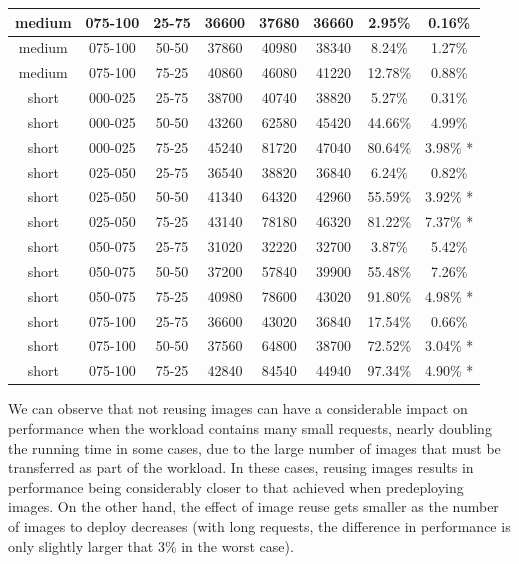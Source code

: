 \begin{table}
\begin{center}
\begin{tabular}{|c|c|c|c|c|c|c|c|}
\\\hline
medium & 075-100 & 25-75 & 36600 & 37680 & 36660 & 2.95\% & 0.16\%
\\\hline
medium & 075-100 & 50-50 & 37860 & 40980 & 38340 & 8.24\% & 1.27\%
\\\hline
medium & 075-100 & 75-25 & 40860 & 46080 & 41220 & 12.78\% & 0.88\%
\\\hline
short & 000-025 & 25-75 & 38700 & 40740 & 38820 & 5.27\% & 0.31\%
\\\hline
short & 000-025 & 50-50 & 43260 & 62580 & 45420 & 44.66\% & 4.99\%
\\\hline
short & 000-025 & 75-25 & 45240 & 81720 & 47040 & 80.64\% & 3.98\% *
\\\hline
short & 025-050 & 25-75 & 36540 & 38820 & 36840 & 6.24\% & 0.82\%
\\\hline
short & 025-050 & 50-50 & 41340 & 64320 & 42960 & 55.59\% & 3.92\% *
\\\hline
short & 025-050 & 75-25 & 43140 & 78180 & 46320 & 81.22\% & 7.37\% *
\\\hline
short & 050-075 & 25-75 & 31020 & 32220 & 32700 & 3.87\% & 5.42\%
\\\hline
short & 050-075 & 50-50 & 37200 & 57840 & 39900 & 55.48\% & 7.26\%
\\\hline
short & 050-075 & 75-25 & 40980 & 78600 & 43020 & 91.80\% & 4.98\% *
\\\hline
short & 075-100 & 25-75 & 36600 & 43020 & 36840 & 17.54\% & 0.66\%
\\\hline
short & 075-100 & 50-50 & 37560 & 64800 & 38700 & 72.52\% & 3.04\% *
\\\hline
short & 075-100 & 75-25 & 42840 & 84540 & 44940 & 97.34\% & 4.90\% *
\\\hline
\end{tabular}
\label{tab:predeployVSfetch}
\end{center}
\end{table}

We can observe that not reusing images can have a considerable impact on performance when the workload contains many small requests, nearly doubling the running time in some cases, due to the large number of images that must be transferred as part of the workload. In these cases, reusing images results in performance being considerably closer to that achieved when predeploying images. On the other hand, the effect of image reuse gets smaller as the number of images to deploy decreases (with long requests, the difference in performance is only slightly larger that 3\% in the worst case).

